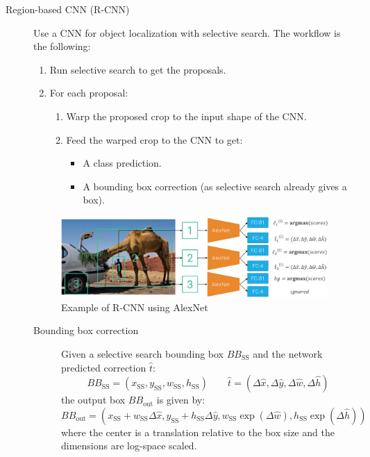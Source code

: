 \begin{description}
    \item[Region-based CNN (R-CNN)] 
        Use a CNN for object localization with selective search. The workflow is the following:
        \begin{enumerate}
            \item Run selective search to get the proposals.
            \item For each proposal:
            \begin{enumerate}
                \item Warp the proposed crop to the input shape of the CNN.
                \item Feed the warped crop to the CNN to get:
                \begin{itemize}
                    \item A class prediction.
                    \item A bounding box correction (as selective search already gives a box).
                \end{itemize}
            \end{enumerate}
        \end{enumerate}

        \begin{figure}[H]
            \centering
            \includegraphics[width=0.8\linewidth]{./img/_r_cnn.pdf}
            \caption{Example of R-CNN using AlexNet}
        \end{figure}

        \begin{description}
            \item[Bounding box correction] 
                Given a selective search bounding box $BB_{\text{SS}}$ and the network predicted correction $\hat{t}$:
                \[ 
                    BB_{\text{SS}} = (x_{\text{SS}}, y_{\text{SS}}, w_{\text{SS}}, h_{\text{SS}})
                    \qquad
                    \hat{t} = (\Delta\hat{x}, \Delta\hat{y}, \Delta\hat{w}, \Delta\hat{h})
                \]
                the output box $BB_{\text{out}}$ is given by:
                \[ 
                    BB_{\text{out}} = ( 
                        x_{\text{SS}} + w_{\text{SS}}\Delta\hat{x},
                        y_{\text{SS}} + h_{\text{SS}}\Delta\hat{y},
                        w_{\text{SS}} \exp(\Delta\hat{w}),
                        h_{\text{SS}} \exp(\Delta\hat{h})
                    ) 
                \]
                where the center is a translation relative to the box size and the dimensions are log-space scaled.


\end{description}
\end{description}
